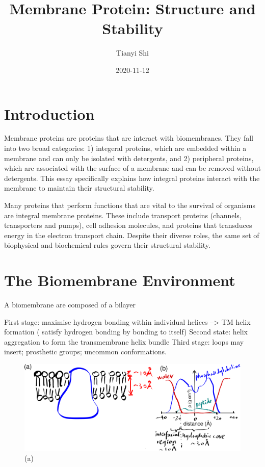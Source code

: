 \documentclass[
]{article}
\title{Membrane Protein: Structure and Stability}
\author{Tianyi Shi}
\date{2020-11-12}
\begin{document}
\maketitle

{
\setcounter{tocdepth}{2}
\tableofcontents
}
\hypertarget{introduction}{%
\section{Introduction}\label{introduction}}

Membrane proteins are proteins that are interact with biomembranes. They fall into two broad categories: 1) integeral proteins, which are embedded within a membrane and can only be isolated with detergents, and 2) peripheral proteins, which are associated with the surface of a membrane and can be removed without detergents. This essay specifically explains how integral proteins interact with the membrane to maintain their structural stability.

Many proteins that perform functions that are vital to the survival of organisms are integral membrane proteins. These include transport proteins (channels, transporters and pumps), cell adhesion molecules, and proteins that transduces energy in the electron transport chain. Despite their diverse roles, the same set of biophysical and biochemical rules govern their structural stability.

\hypertarget{the-biomembrane-environment}{%
\section{The Biomembrane Environment}\label{the-biomembrane-environment}}

A biomembrane are composed of a bilayer

First stage: maximise hydrogen bonding within individual helices --\textgreater{} TM helix formation ( satisfy hydrogen bonding by bonding to itself)
Second state: helix aggregation to form the transmembrane helix bundle
Third stage: loops may insert; prosthetic groups; uncommon conformations.

\begin{figure}
\includegraphics[width=1\linewidth]{../img/lipid-bilayer-diagram.png} \caption{(a)}\label{fig:lipid-bilayer-diagram}
\end{figure}
\end{document}
